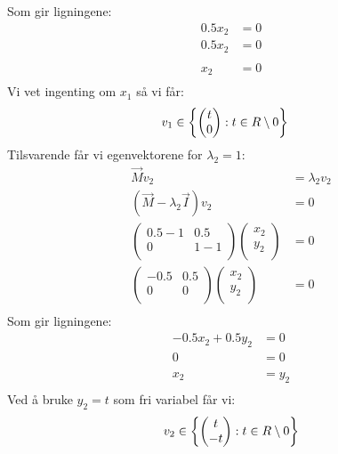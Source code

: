Som gir ligningene:
\begin{align*}
  0.5x_2 &= 0\\
  0.5x_2 &= 0\\
  \\
  x_2 &= 0\\
\end{align*}
Vi vet ingenting om $x_1$ så vi får:
\begin{align*}
  v_1 &\in \left\{ 
        \begin{pmatrix}
          t\\
          0\\
        \end{pmatrix}:
  t \in R \setminus 0 \right \}
\end{align*}
Tilsvarende får vi egenvektorene for $\lambda_2 = 1$:
\begin{align*}
  \vec{M}v_2 &= \lambda_2 v_2\\
  (\vec{M}-\lambda_2\vec{I})v_2 &= 0\\
  \begin{pmatrix}
    0.5-1 & 0.5 \\
    0 & 1-1 \\
  \end{pmatrix}
  \begin{pmatrix}
    x_2\\
    y_2\\
  \end{pmatrix}&=0\\
  \begin{pmatrix}
    -0.5 & 0.5 \\
    0 & 0 \\
  \end{pmatrix}
  \begin{pmatrix}
    x_2\\
    y_2\\
  \end{pmatrix}&=0\\
\end{align*}
Som gir ligningene:
\begin{align*}
  -0.5x_2 + 0.5y_2 &= 0\\
  0&= 0\\
  \\
  x_2 &= y_2\\
\end{align*}
Ved å bruke $y_2=t$ som fri variabel får vi:
\begin{align*}
  v_2 \in \left\{ 
  \begin{pmatrix}
    t \\
    -t \\
  \end{pmatrix}
  : t \in R \setminus 0 
   \right \}
\end{align*}

